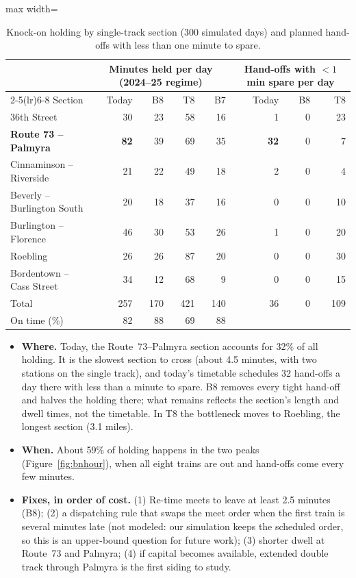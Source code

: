 \documentclass[11pt]{article}
\begin{document}
\begin{table}[ht]\centering\small
\begin{adjustbox}{max width=\linewidth}
\begin{tabular}{@{}lrrrrrrr@{}}
\toprule
& \multicolumn{4}{c}{Minutes held per day (2024--25 regime)} & \multicolumn{3}{c}{Hand-offs with $<1$ min spare per day} \\
\cmidrule(lr){2-5}\cmidrule(lr){6-8}
Section & Today & B8 & T8 & B7 & Today & B8 & T8 \\ \midrule
36th Street & 30 & 23 & 58 & 16 & 1 & 0 & 23 \\
\textbf{Route 73 -- Palmyra} & \textbf{82} & 39 & 69 & 35 & \textbf{32} & 0 & 7 \\
Cinnaminson -- Riverside & 21 & 22 & 49 & 18 & 2 & 0 & 4 \\
Beverly -- Burlington South & 20 & 18 & 37 & 16 & 0 & 0 & 10 \\
Burlington -- Florence & 46 & 30 & 53 & 26 & 1 & 0 & 20 \\
Roebling & 26 & 26 & 87 & 20 & 0 & 0 & 30 \\
Bordentown -- Cass Street & 34 & 12 & 68 & 9 & 0 & 0 & 15 \\ \midrule
Total & 257 & 170 & 421 & 140 & 36 & 0 & 109 \\
On time (\%) & 82 & 88 & 69 & 88 & & & \\
\bottomrule
\end{tabular}
\end{adjustbox}
\caption{Knock-on holding by single-track section (300 simulated days) and planned hand-offs with less than one minute to spare.}\label{tab:bottle}
\end{table}

\begin{itemize}
\item \textbf{Where.} Today, the Route~73--Palmyra section accounts for 32\% of all holding. It is the slowest section to cross (about 4.5 minutes, with two stations on the single track), and today's timetable schedules 32 hand-offs a day there with less than a minute to spare. B8 removes every tight hand-off and halves the holding there; what remains reflects the section's length and dwell times, not the timetable. In T8 the bottleneck moves to Roebling, the longest section (3.1 miles).
\item \textbf{When.} About 59\% of holding happens in the two peaks (Figure~\ref{fig:bnhour}), when all eight trains are out and hand-offs come every few minutes.
\item \textbf{Fixes, in order of cost.} (1) Re-time meets to leave at least 2.5 minutes (B8); (2) a dispatching rule that swaps the meet order when the first train is several minutes late (not modeled: our simulation keeps the scheduled order, so this is an upper-bound question for future work); (3) shorter dwell at Route~73 and Palmyra; (4) if capital becomes available, extended double track through Palmyra is the first siding to study.
\end{itemize}
\end{document}
